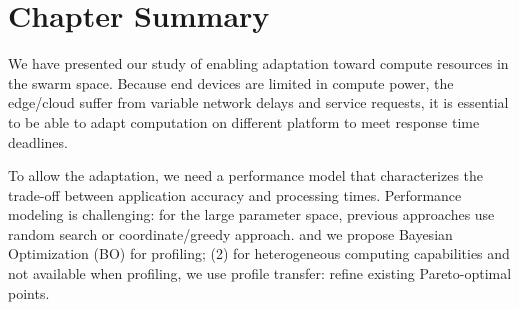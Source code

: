 \section{Chapter Summary}
\label{sec:chap-summary}

We have presented our study of enabling adaptation toward compute resources in
the swarm space. Because end devices are limited in compute power, the
edge/cloud suffer from variable network delays and service requests, it is
essential to be able to adapt computation on different platform to meet response
time deadlines.

To allow the adaptation, we need a performance model that characterizes the
trade-off between application accuracy and processing times. Performance
modeling is challenging: for the large parameter space, previous approaches use
random search or coordinate/greedy approach. and we propose Bayesian
Optimization (BO) for profiling; (2) for heterogeneous computing capabilities
and not available when profiling, we use profile transfer: refine existing
Pareto-optimal points.

